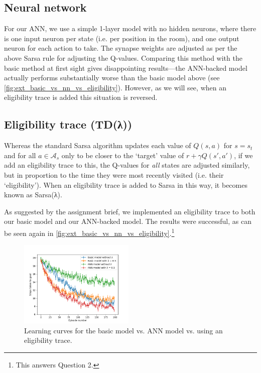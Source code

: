 \documentclass[a4paper, 11pt, twocolumn, final]{article} %
\begin{document}
\subsection{Neural network} \label{sec:ext_nn} For our ANN, we use a simple
1-layer model with no hidden neurons, where there is one input neuron per state
(i.e. per position in the room), and one output neuron for each action to take.
The synapse weights are adjusted as per the above Sarsa rule for adjusting the
Q-values.  Comparing this method with the basic method at first sight gives
disappointing results---the ANN-backed model actually performs substantially
worse than the basic model above (see
\autoref{fig:ext_basic_vs_nn_vs_eligibility}).  However, as we will see, when an
eligibility trace is added this situation is reversed.

\subsection{Eligibility trace (TD(λ))} Whereas the standard Sarsa algorithm
updates each value of $Q(s, a)$ for $s = s_t$ and for all $a \in \mathcal{A}_s$
only to be closer to the `target' value of $r + \gamma Q(s', a')$, if we add an
eligibility trace to this, the Q-values for \textit{all} states are adjusted
similarly, but in proportion to the time they were most recently visited (i.e.
their `eligibility').  When an eligibility trace is added to Sarsa in this way,
it becomes known as Sarsa(λ).

As suggested by the assignment brief, we implemented an eligibility trace to
both our basic model and our ANN-backed model.  The results were successful, as
can be seen again in \autoref{fig:ext_basic_vs_nn_vs_eligibility}.\footnote{This
answers Question 2.}

\begin{figure}
  \includegraphics[width=0.49\textwidth]{figures/basic_vs_nn_vs_eligibility.png}
  \caption{Learning curves for the basic model vs. ANN model vs. using an
  eligibility trace.}
  \label{fig:ext_basic_vs_nn_vs_eligibility}
\end{figure}
\end{document}
